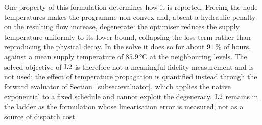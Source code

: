 One property of this formulation determines how it is reported. Freeing the node temperatures
makes the programme non-convex and, absent a hydraulic penalty on the resulting flow
increase, degenerate: the optimiser reduces the supply temperature uniformly to its lower
bound, collapsing the loss term rather than reproducing the physical decay. In the solve it
does so for about $91$\,\% of hours, against a mean supply temperature of $85.9$\,°C at the
neighbouring levels. The solved objective of $\mathrm{L2}$ is therefore not a meaningful fidelity
measurement and is not used; the effect of temperature propagation is quantified
instead through the forward evaluator of Section~\ref{subsec:evaluator}, which applies the
native exponential to a fixed schedule and cannot exploit the degeneracy. $\mathrm{L2}$ remains in
the ladder as the formulation whose linearisation error is measured, not as a source of
dispatch cost.

